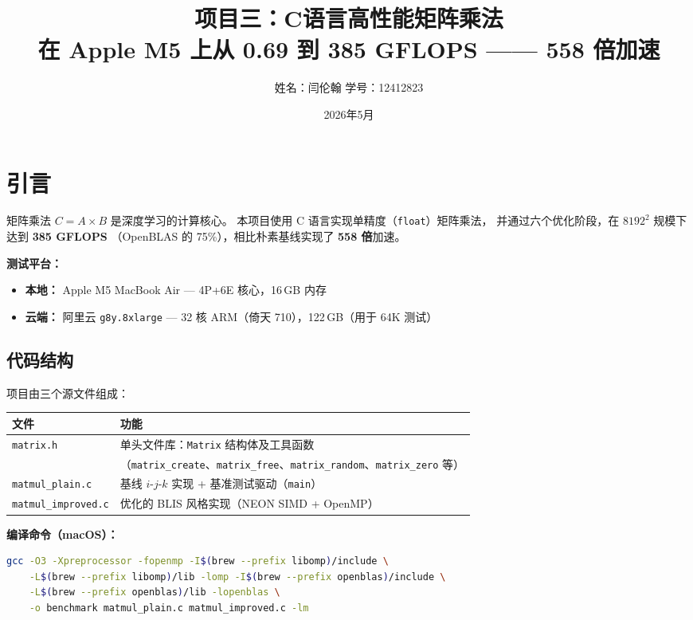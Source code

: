 \documentclass[11pt,a4paper]{article}
\title{\textbf{项目三：C语言高性能矩阵乘法}\\[0.4em]
\large 在 Apple M5 上从 0.69 到 385 GFLOPS —— 558 倍加速}
\author{姓名：闫伦翰 \quad 学号：12412823}
\date{2026年5月}
\begin{document}
\maketitle

\section{引言}

矩阵乘法 $C=A\times B$ 是深度学习的计算核心。
本项目使用 C 语言实现单精度（\texttt{float}）矩阵乘法，
并通过六个优化阶段，在 $8192^2$ 规模下达到 \textbf{385 GFLOPS}
（OpenBLAS 的 75\%），相比朴素基线实现了 \textbf{558 倍}加速。

\textbf{测试平台：}
\begin{itemize}[nosep]
  \item \textbf{本地：} Apple M5 MacBook Air --- 4P+6E 核心，16\,GB 内存
  \item \textbf{云端：} 阿里云 \texttt{g8y.8xlarge} --- 32 核 ARM（倚天 710），122\,GB（用于 64K 测试）
\end{itemize}

\subsection*{代码结构}

项目由三个源文件组成：

\begin{table}[H]\centering
\begin{tabular}{l|l}
\toprule
\textbf{文件} & \textbf{功能} \\
\midrule
\texttt{matrix.h} & 单头文件库：\texttt{Matrix} 结构体及工具函数 \\
                   & （\texttt{matrix\_create}、\texttt{matrix\_free}、\texttt{matrix\_random}、\texttt{matrix\_zero} 等） \\
\texttt{matmul\_plain.c} & 基线 $i$-$j$-$k$ 实现 + 基准测试驱动（\texttt{main}） \\
\texttt{matmul\_improved.c} & 优化的 BLIS 风格实现（NEON SIMD + OpenMP） \\
\bottomrule
\end{tabular}
\end{table}

\noindent\textbf{编译命令（macOS）：}
\begin{lstlisting}[language=bash,numbers=none,basicstyle=\ttfamily\scriptsize]
gcc -O3 -Xpreprocessor -fopenmp -I$(brew --prefix libomp)/include \
    -L$(brew --prefix libomp)/lib -lomp -I$(brew --prefix openblas)/include \
    -L$(brew --prefix openblas)/lib -lopenblas \
    -o benchmark matmul_plain.c matmul_improved.c -lm
\end{lstlisting}
\end{document}
